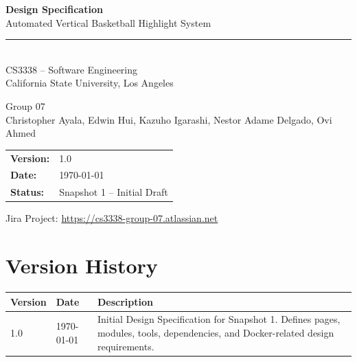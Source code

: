 \documentclass[12pt]{article}
\begin{document}
\begin{titlepage}
    \centering
    \vspace*{2cm}

    {\LARGE\bfseries Design Specification\\[0.5em]}
    {\Large Automated Vertical Basketball Highlight System\\[2em]}

    \rule{\linewidth}{0.5pt}\\[1em]

    {\large CS3338 -- Software Engineering\\
    California State University, Los Angeles\\[1em]}

    {\large Group 07\\[2em]}
    {\normalsize Christopher Ayala, Edwin Hui, Kazuho Igarashi, Nestor Adame Delgado, Ovi Ahmed\\[2em]}

    \begin{tabular}{ll}
        \textbf{Version:}  & 1.0                   \\
        \textbf{Date:}     & \today                \\
        \textbf{Status:}   & Snapshot 1 -- Initial Draft \\
    \end{tabular}

    \vfill
    {\small Jira Project: \href{https://cs3338-group-07.atlassian.net}{https://cs3338-group-07.atlassian.net}}
\end{titlepage}

\newpage
\tableofcontents
\newpage

\section*{Version History}

\begin{longtable}{|p{1in}|p{1.5in}|p{3.5in}|}
\hline
\textbf{Version} & \textbf{Date} & \textbf{Description} \\
\hline
1.0 & \today & Initial Design Specification for Snapshot 1. Defines pages, modules, tools, dependencies, and Docker-related design requirements. \\
\hline
\end{longtable}
\end{document}
